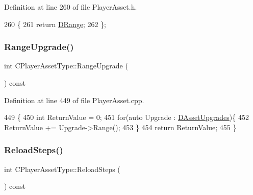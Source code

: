 Definition at line 260 of file Player\+Asset.\+h.


\begin{DoxyCode}
260                          \{
261             \textcolor{keywordflow}{return} \hyperlink{classCPlayerAssetType_a1204a9470d8940fdb81a63670a0f6779}{DRange};  
262         \};
\end{DoxyCode}
\hypertarget{classCPlayerAssetType_a85643bb4b6dc70561603f6567bc7358a}{}\label{classCPlayerAssetType_a85643bb4b6dc70561603f6567bc7358a} 
\subsubsection{\texorpdfstring{Range\+Upgrade()}{RangeUpgrade()}}
{\footnotesize\ttfamily int C\+Player\+Asset\+Type\+::\+Range\+Upgrade (\begin{DoxyParamCaption}{ }\end{DoxyParamCaption}) const}



Definition at line 449 of file Player\+Asset.\+cpp.


\begin{DoxyCode}
449                                         \{
450     \textcolor{keywordtype}{int} ReturnValue = 0;
451     \textcolor{keywordflow}{for}(\textcolor{keyword}{auto} Upgrade : \hyperlink{classCPlayerAssetType_aeb8d5c3ea81ea56248d02a5e24d48001}{DAssetUpgrades})\{
452         ReturnValue += Upgrade->Range();
453     \}
454     \textcolor{keywordflow}{return} ReturnValue;
455 \}
\end{DoxyCode}
\hypertarget{classCPlayerAssetType_a2e6670a72cb6e48cc481ee398db2f2ab}{}\label{classCPlayerAssetType_a2e6670a72cb6e48cc481ee398db2f2ab} 
\subsubsection{\texorpdfstring{Reload\+Steps()}{ReloadSteps()}}
{\footnotesize\ttfamily int C\+Player\+Asset\+Type\+::\+Reload\+Steps (\begin{DoxyParamCaption}{ }\end{DoxyParamCaption}) const\hspace{0.3cm}{\ttfamily [inline]}}



